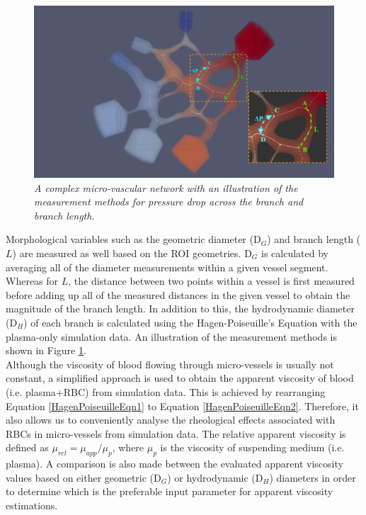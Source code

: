 \bigskip

\begin{figure}[H]
\centering
\includegraphics[width=1\textwidth]{images/ROI3-Geometry.png}
\caption{\textit{A complex micro-vascular network with an illustration of the measurement methods for pressure drop across the branch and branch length.} \label{measurementmethods}}
\end{figure}

\noindent Morphological variables such as the geometric diameter (D$_{G}$) and branch length ($L$) are measured as well based on the ROI geometries. D$_{G}$ is calculated by averaging all of the diameter measurements within a given vessel segment. Whereas for $L$, the distance between two points within a vessel is first measured before adding up all of the measured distances in the given vessel to obtain the magnitude of the branch length. In addition to this, the hydrodynamic diameter (D$_{H}$) of each branch is calculated using the Hagen-Poiseuille's Equation with the plasma-only simulation data. An illustration of the measurement methods is shown in Figure \ref{measurementmethods}. \\

\noindent Although the viscosity of blood flowing through micro-vessels is usually not constant, a simplified approach is used to obtain the apparent viscosity of blood (i.e. plasma+RBC) from simulation data. This is achieved by rearranging Equation \ref{HagenPoiseuilleEqn1} to Equation \ref{HagenPoiseuilleEqn2}. Therefore, it also allows us to conveniently analyse the rheological effects associated with RBCs in micro-vessels from simulation data. The relative apparent viscosity is defined as $\mu_{rel} = \mu_{app}/\mu_{p}$, where $\mu_{p}$ is the viscosity of suspending medium (i.e. plasma). A comparison is also made between the evaluated apparent viscosity values based on either geometric (D$_{G}$) or hydrodynamic (D$_{H}$) diameters in order to determine which is the preferable input parameter for apparent viscosity estimations. 



